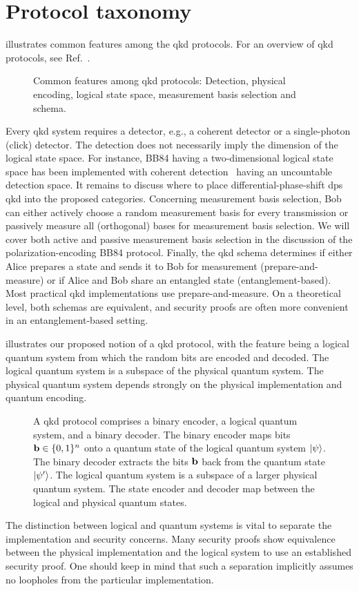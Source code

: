 \section{Protocol taxonomy}

 illustrates common features among the \gls{qkd} protocols.
For an overview of \gls{qkd} protocols, see Ref.~\cite{Duvsek2006}.
\begin{figure}[htb]
	\centering
	
	\caption{Common features among \gls{qkd} protocols: Detection, physical encoding, logical state space, measurement basis selection and schema.}\label{fig:qkd_classification}
\end{figure}
Every \gls{qkd} system requires a detector, e.g., a coherent detector or a single-photon (click) detector.
The detection does not necessarily imply the dimension of the logical state space.
For instance, BB84 having a two-dimensional logical state space has been implemented with coherent detection~\cite{Qi2021} having an uncountable detection space.
It remains to discuss where to place differential-phase-shift \gls{dps} \gls{qkd} into the proposed categories.
Concerning measurement basis selection, Bob can either actively choose a random measurement basis for every transmission or passively measure all (orthogonal) bases for measurement basis selection.
We will cover both active and passive measurement basis selection in the discussion of the polarization-encoding BB84 protocol.
Finally, the \gls{qkd} schema determines if either Alice prepares a state and sends it to Bob for measurement (prepare-and-measure) or if Alice and Bob share an entangled state (entanglement-based).
Most practical \gls{qkd} implementations use prepare-and-measure.
On a theoretical level, both schemas are equivalent, and security proofs are often more convenient in an entanglement-based setting.

 illustrates our proposed notion of a \gls{qkd} protocol, with the feature being a logical quantum system from which the random bits are encoded and decoded.
The logical quantum system is a subspace of the physical quantum system.
The physical quantum system depends strongly on the physical implementation and quantum encoding.
\begin{figure}[htb]
	\centering
	
	\caption{A \gls{qkd} protocol comprises a binary encoder, a logical quantum system, and a binary decoder. The binary encoder maps bits $\vb{b}\in\{0,1\}^n$ onto a quantum state of the logical quantum system $\ket{\psi}$. The binary decoder extracts the bits $\vb{b}$ back from the quantum state $\ket{\psi^\prime}$. The logical quantum system is a subspace of a larger physical quantum system. The state encoder and decoder map between the logical and physical quantum states.}\label{fig:qkd_protocol}
\end{figure}
The distinction between logical and quantum systems is vital to separate the implementation and security concerns.
Many security proofs show equivalence between the physical implementation and the logical system to use an established security proof.
One should keep in mind that such a separation implicitly assumes no loopholes from the particular implementation.
